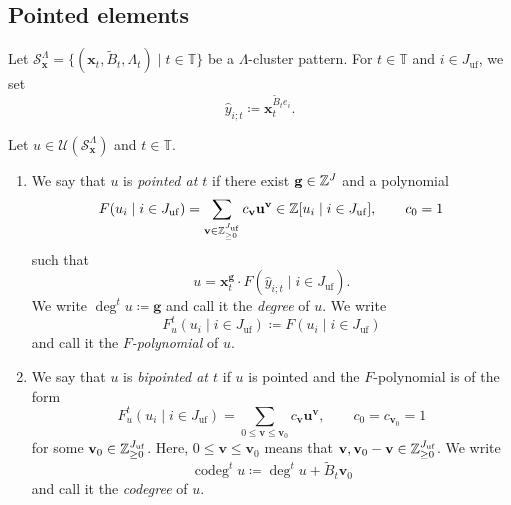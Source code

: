 \subsection{Pointed elements}
\label{ssec : pointed elements}

Let
$\mathcal{S}_{\mathbf{x}}^{\Lambda}
= \{(\mathbf{x}_t, \widetilde{B}_t, \Lambda_t)
\mid t \in \mathbb{T}\}$
be a $\Lambda$-cluster pattern.
For $t \in \mathbb{T}$ and $i \in J_{\mathrm{uf}}$, we set
\[
\widehat{y}_{i;t} \coloneq \mathbf{x}_t^{\widetilde{B}_t e_i}.
\]

\begin{Def}
\label{Def : pointed and bipointed elements}
Let $u \in \mathcal{U}(\mathcal{S}_{\mathbf{x}}^{\Lambda})$
and $t \in \mathbb{T}$.
\begin{enumerate}
    \item[(i)] We say that $u$ is \emph{pointed at $t$}
    if there exist $\mathbf{g} \in \mathbb{Z}^J$ and a polynomial
    \[
    F(u_i \mid i \in J_{\mathrm{uf}})
    = \sum_{\mathbf{v} \in \mathbb{Z}_{\geq 0}^{J_{\mathrm{uf}}}}c_{\mathbf{v}}\mathbf{u}^{\mathbf{v}}
    \in \mathbb{Z}[u_i \mid i \in J_{\mathrm{uf}}],
    \qquad c_0 = 1
    \]
    such that
    \[
    u = \mathbf{x}_t^{\mathbf{g}}
    \cdot F(\widehat{y}_{i;t} \mid i \in J_{\mathrm{uf}}).
    \]
    We write $\deg^t u \coloneq \mathbf{g}$
    and call it the \emph{degree} of $u$.
    We write
    \[
    F_u^t(u_i \mid i \in J_{\mathrm{uf}})
    \coloneq F(u_i \mid i \in J_{\mathrm{uf}})
    \]
    and call it the \emph{$F$-polynomial} of $u$.
    \item[(ii)] We say that $u$ is \emph{bipointed at $t$}
    if $u$ is pointed and the $F$-polynomial is of the form
    \[
    F_u^t(u_i \mid i \in J_{\mathrm{uf}})
    = \sum_{0 \leq \mathbf{v} \leq \mathbf{v}_0}c_{\mathbf{v}}\mathbf{u}^{\mathbf{v}},
    \qquad c_0 = c_{\mathbf{v}_0} = 1
    \]
    for some $\mathbf{v}_0 \in \mathbb{Z}_{\geq 0}^{J_{\mathrm{uf}}}$.
    Here, $0 \leq \mathbf{v} \leq \mathbf{v}_0$ means that
    $\mathbf{v}, \mathbf{v}_0 - \mathbf{v} \in \mathbb{Z}_{\geq 0}^{J_{\mathrm{uf}}}$.
    We write
    \[
    \operatorname{codeg}^t u
    \coloneq \deg^t u + \widetilde{B}_t\mathbf{v}_0
    \]
    and call it the \emph{codegree} of $u$.
\end{enumerate}
\end{Def}

